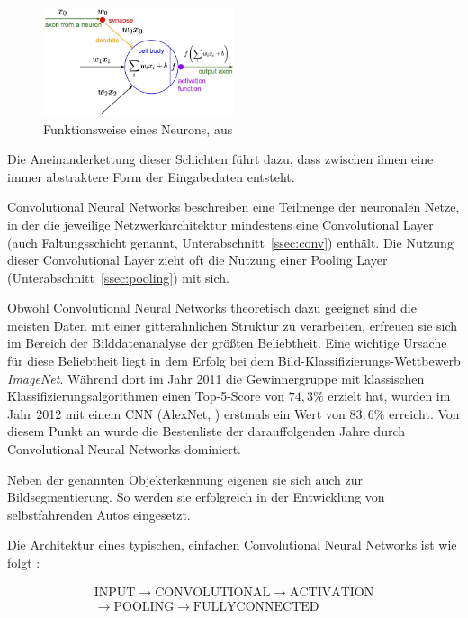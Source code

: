 \begin{figure}[h!]
	\centering
	\includegraphics[width=0.5\textwidth,keepaspectratio]{images/cs231n/neuron.jpg}
	\caption{Funktionsweise eines Neurons, aus \cite{cs231n}}
	\label{fig:neuron}
\end{figure}

Die Aneinanderkettung dieser Schichten führt dazu, dass zwischen ihnen eine immer abstraktere Form der Eingabedaten entsteht.

Convolutional Neural Networks beschreiben eine Teilmenge der neuronalen Netze, in der die jeweilige Netzwerkarchitektur mindestens eine Convolutional Layer (auch Faltungsschicht genannt, \vgl Unterabschnitt~\ref{ssec:conv}) enthält. Die Nutzung dieser Convolutional Layer zieht oft die Nutzung einer Pooling Layer (Unterabschnitt~\ref{ssec:pooling}) mit sich. \cite{deeplearning_16}

Obwohl Convolutional Neural Networks theoretisch dazu geeignet sind die meisten Daten mit einer gitterähnlichen Struktur zu verarbeiten, erfreuen sie sich im Bereich der Bilddatenanalyse der größten Beliebtheit. \cite[Kap.~9]{deeplearning_16} Eine wichtige Ursache für diese Beliebtheit liegt \bspw in dem Erfolg bei dem Bild-Klassifizierungs-Wettbewerb \textit{ImageNet}. Während dort im Jahr 2011 die Gewinnergruppe mit klassischen Klassifizierungsalgorithmen einen Top-5-Score von $74,3\%$ erzielt hat, wurden im Jahr 2012 mit einem CNN (AlexNet, \cite{alexnet}) erstmals ein Wert von $83,6\%$ erreicht. Von diesem Punkt an wurde die Bestenliste der darauffolgenden Jahre durch Convolutional Neural Networks dominiert. \cite[Kap.~1]{deeplearning_18}

Neben der genannten Objekterkennung eigenen sie sich auch zur Bildsegmentierung. So werden sie \bspw erfolgreich in der Entwicklung von selbstfahrenden Autos eingesetzt. \cite{kaymak_19}

Die Architektur eines typischen, einfachen Convolutional Neural Networks ist wie folgt \cite{cs231n}:

\begin{multline*}
\mathrm{INPUT}\rightarrow\mathrm{CONVOLUTIONAL}\rightarrow\mathrm{ACTIVATION}\\\rightarrow\mathrm{POOLING}\rightarrow\mathrm{FULLYCONNECTED}
\end{multline*}

